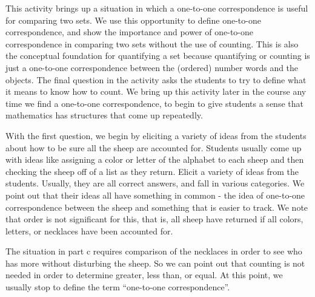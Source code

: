 \documentclass[handout]{ximera}
\begin{document}
\newpage
\begin{instructorNotes}

This activity brings up a situation in which a one-to-one correspondence is useful for comparing two sets.  We use this opportunity to define one-to-one correspondence, and show the importance and power of one-to-one correspondence in comparing two sets without the use of counting. 
This is also the conceptual foundation for quantifying a set because quantifying or counting is just a one-to-one correspondence between the (ordered) number words and the objects.  
The final question in the activity asks the students to try to define what it means to know how to count. We bring up this activity later in the course any time we find a one-to-one correspondence, to begin to give students a sense that mathematics has structures that come up repeatedly.


With the first question, we begin by eliciting a variety of ideas from the students about how to be sure all the sheep are accounted for.  Students usually come up with ideas like assigning a color or letter of the alphabet to each sheep and then checking the sheep off of a list as they return.  Elicit a variety of ideas from the students. Usually, they are all correct answers, and fall in various categories.  We point out that their ideas all have something in common - the idea of one-to-one correspondence between the sheep and something that is easier to track.  We note that order is not significant for this, that is, all sheep have returned if all colors, letters, or necklaces have been accounted for.


The situation in part c requires comparison of the necklaces in order to see who has more without disturbing the sheep.  So we can point out that counting is not needed in order to determine greater, less than, or equal. At this point, we usually stop to define the term ``one-to-one correspondence''.




\end{instructorNotes}
\end{document}
